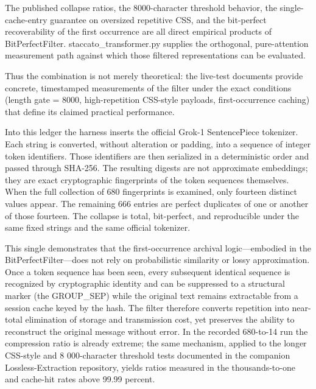The published collapse ratios, the 8000-character threshold behavior, the single-cache-entry guarantee on oversized repetitive CSS, and the bit-perfect recoverability of the first occurrence are all direct empirical products of BitPerfectFilter. staccato_transformer.py supplies the orthogonal, pure-attention measurement path against which those filtered representations can be evaluated.

Thus the combination is not merely theoretical: the live-test documents provide concrete, timestamped measurements of the filter under the exact conditions (length gate = 8000, high-repetition CSS-style payloads, first-occurrence caching) that define its claimed practical performance.

Into this ledger the harness inserts the official Grok-1 SentencePiece tokenizer. Each string is converted, without alteration or padding, into a sequence of integer token identifiers. Those identifiers are then serialized in a deterministic order and passed through SHA-256. The resulting digests are not approximate embeddings; they are exact cryptographic fingerprints of the token sequences themselves. When the full collection of 680 fingerprints is examined, only fourteen distinct values appear. The remaining 666 entries are perfect duplicates of one or another of those fourteen. The collapse is total, bit-perfect, and reproducible under the same fixed strings and the same official tokenizer.  

This single demonstrates that the first-occurrence archival logic—embodied in the BitPerfectFilter—does not rely on probabilistic similarity or lossy approximation. Once a token sequence has been seen, every subsequent identical sequence is recognized by cryptographic identity and can be suppressed to a structural marker (the GROUP_SEP) while the original text remains extractable from a session cache keyed by the hash. The filter therefore converts repetition into near-total elimination of storage and transmission cost, yet preserves the ability to reconstruct the original message without error. In the recorded 680-to-14 run the compression ratio is already extreme; the same mechanism, applied to the longer CSS-style and 8 000-character threshold tests documented in the companion Lossless-Extraction repository, yields ratios measured in the thousands-to-one and cache-hit rates above 99.99 percent.  

